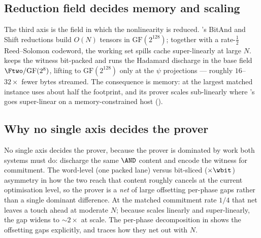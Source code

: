 \subsection{Reduction field decides memory and scaling}
\label{sec:axis-field}

The third axis is the field in which the nonlinearity is reduced.
\binius{}'s BitAnd and Shift reductions build $O(N)$ tensors in
$\mathrm{GF}(2^{128})$; together with a rate-$\tfrac12$ Reed--Solomon
codeword, the working set spills cache super-linearly at large $N$.
\zinc{} keeps the witness bit-packed and runs the Hadamard discharge in the
base field $\Ftwo/\mathrm{GF}(2^8)$, lifting to $\mathrm{GF}(2^{128})$
only at the $\psi$ projections --- roughly $16$--$32\times$ fewer bytes
streamed. The consequence is memory: at the largest matched instance
\zinc{} uses about half the footprint, and its prover scales sub-linearly
where \binius{}'s goes super-linear on a memory-constrained host
().

\subsection{Why no single axis decides the prover}

No single axis decides the prover, because the prover is dominated by
work both systems must do: discharge the same $\AND$ content and encode
the witness for commitment. The word-level (one packed lane) versus
bit-sliced ($\times\wbit$) asymmetry in how the two reach that content
roughly cancels at the current optimisation level, so the prover is a
\emph{net} of large offsetting per-phase gaps rather than a single
dominant difference. At the matched commitment rate $1/4$ that net leaves
\zinc{} a touch ahead at moderate $N$; because \zinc{} scales linearly and
\binius{} super-linearly, the gap widens to $\sim$$2\times$ at scale. The
per-phase decomposition in  shows the offsetting gaps
explicitly, and  traces how they net out with $N$.
